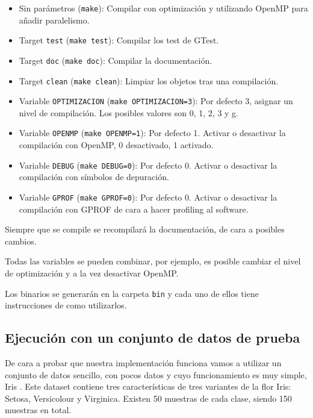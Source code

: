 \begin{itemize}
	\item Sin parámetros (\texttt{make}): Compilar con optimización y utilizando OpenMP para añadir paralelismo.
	\item Target \texttt{test} (\texttt{make test}): Compilar los test de GTest.
	\item Target \texttt{doc} (\texttt{make doc}): Compilar la documentación.
	\item Target \texttt{clean} (\texttt{make clean}): Limpiar los objetos tras una compilación.
	\item Variable \texttt{OPTIMIZACION} (\texttt{make OPTIMIZACION=3}): Por defecto 3, asignar un nivel de compilación. Los posibles valores son 0, 1, 2, 3 y g.
	\item Variable \texttt{OPENMP} (\texttt{make OPENMP=1}): Por defecto 1. Activar o desactivar la compilación con OpenMP, 0 desactivado, 1 activado.
	\item Variable \texttt{DEBUG} (\texttt{make DEBUG=0}): Por defecto 0. Activar o desactivar la compilación con símbolos de depuración.
	\item Variable \texttt{GPROF} (\texttt{make GPROF=0}): Por defecto 0. Activar o desactivar la compilación con GPROF de cara a hacer profiling al software.

\end{itemize}

Siempre que se compile se recompilará la documentación, de cara a posibles cambios.

Todas las variables se pueden combinar, por ejemplo, es posible cambiar el nivel de optimización y a la vez desactivar OpenMP.

Los binarios se generarán en la carpeta \texttt{bin} y cada uno de ellos tiene instrucciones de como utilizarlos.

\newpage

\subsection{Ejecución con un conjunto de datos de prueba}

De cara a probar que nuestra implementación funciona vamos a utilizar un conjunto de datos sencillo, con pocos datos y cuyo funcionamiento es muy simple, Iris \cite{irisDataset}. Este dataset contiene tres características de tres variantes de la flor Iris: Setosa, Versicolour y Virginica. Existen 50 muestras de cada clase, siendo 150 muestras en total.

